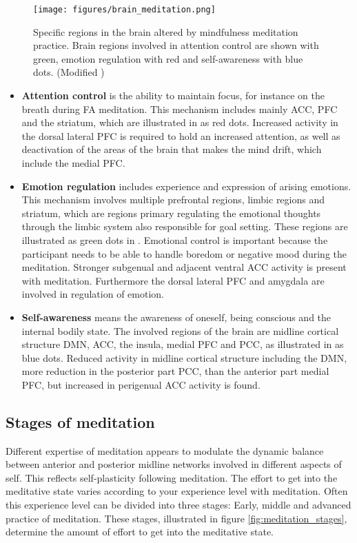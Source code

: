 \begin{figure}[H]
	\texttt{[image: figures/brain\_meditation.png]} 
\caption{Specific regions in the brain altered by mindfulness meditation practice. Brain regions involved in attention control are shown with green, emotion regulation with red and self-awareness with blue dots. (Modified \cite{Tang2017})}
\label{fig:brain_meditation}  
\end{figure}

  
\begin{itemize}
	\item \textbf{Attention control} is the ability to maintain focus, for instance on the breath during FA meditation. This mechanism includes mainly ACC, PFC and the striatum, which are illustrated in  as red dots. Increased activity in the dorsal lateral PFC is required to hold an increased attention, as well as deactivation of the areas of the brain that makes the mind drift, which include the medial PFC. \cite{Tang2017}
	\item \textbf{Emotion regulation} includes experience and expression of arising emotions. This mechanism involves multiple prefrontal regions, limbic regions and striatum, which are regions primary regulating the emotional thoughts through the limbic system also responsible for goal setting. These regions are illustrated as green dots in . Emotional control is important because the participant needs to be able to handle boredom or negative mood during the meditation. Stronger subgenual and adjacent ventral ACC activity is present with meditation. Furthermore the dorsal lateral PFC and amygdala are involved in regulation of emotion. \cite{Tang2017}
	\item \textbf{Self-awareness} means the awareness of oneself, being conscious and the internal bodily state. The involved regions of the brain are midline cortical structure DMN, ACC, the insula, medial PFC and PCC, as illustrated in  as blue dots. Reduced activity in midline cortical structure including the DMN, more reduction in the posterior part PCC, than the anterior part medial PFC, but increased in perigenual ACC activity is found.  \cite{Tang2017}
\end{itemize}


\subsection{Stages of meditation}
Different expertise of meditation appears to modulate the dynamic balance between anterior and posterior midline networks involved in different aspects of self. This reflects self-plasticity following meditation. 
The effort to get into the meditative state varies according to your experience level with meditation. Often this experience level can be divided into three stages: Early, middle and advanced practice of meditation. These stages, illustrated in figure \ref{fig:meditation_stages}, determine the amount of effort to get into the meditative state. \cite{Tang2017} 

